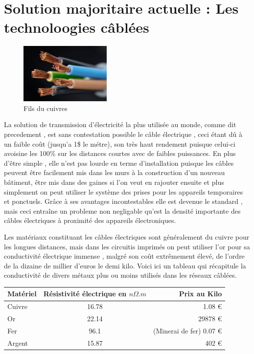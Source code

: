 \documentclass[12pt]{report}
\begin{document}
\section{Solution majoritaire actuelle : Les technoloogies câblées}
\begin{figure}
  \begin{center}
    \includegraphics[width=0.4\textwidth]{copperWire}
  \end{center}
  \caption{Fils du cuivres}
\end{figure} La solution de transmission d'électricité la plus utilisée au monde, comme dit precedement , est sans contestation possible le câble électrique , ceci étant dû à un faible coût (jusqu'a 1\$ le métre), son très haut rendement puisque celui-ci avoisine les 100\% sur les distances courtes avec de faibles puissances. En plus d'être simple , elle n'est pas lourde en terme d'installation puisque les câbles peuvent être facilement mis dans les murs à la construction d'un nouveau bâtiment, être mis dans des gaines si l'on veut en rajouter ensuite et plus simplement on peut utiliser le système des prises pour les appareils temporaires et ponctuels. Grâce à ses avantages incontestables elle est devenue le standard , mais ceci entraîne un probleme non negligable qu'est la densité importante des câbles électriques à proximité des appareils électroniques.
	
	Les matériaux constituant les câbles électriques sont généralement du cuivre pour les longues distances, mais dans les circuitis imprimés on peut utiliser l'or pour sa conductivité électrique immense , malgré son coût extrêmement élevé, de l'ordre de la dizaine de millier d'euros le demi kilo. Voici ici un tableau qui récapitule la conductivité de divers métaux plus ou moins utilisés dans les réseaux câblées.

\begin{center}
\begin{tabular}{| l | c | r |}
	\hline
	Matériel & Résistivité électrique en \( n\Omega .m \)& Prix au Kilo \\
	\hline
	Cuivre & 16.78 & 1.08 \euro{}  \\
	Or & 22.14 & 29878 \euro{}  \\
	Fer & 96.1 & (Minerai de fer) 0.07 \euro{}  \\
	Argent & 15.87 & 402 \euro{}  \\
	\hline
\end{tabular}
\end{center}
\end{document}
